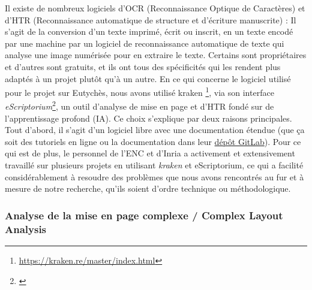 \documentclass[a4paper, twoside, 12pt]{book}
\begin{document}
Il existe de nombreux logiciels d'OCR (Reconnaissance Optique de Caractères) et d'HTR (Reconnaissance automatique de structure et d’écriture manuscrite) : Il s’agit de la conversion d’un texte imprimé, écrit ou inscrit, en un texte encodé par une machine par un logiciel de reconnaissance automatique de texte qui analyse une image numérisée pour en extraire le texte. Certains sont propriétaires et d'autres sont gratuits, et ils ont tous des spécificités qui les rendent plus adaptés à un projet plutôt qu'à un autre. En ce qui concerne le logiciel utilisé pour le projet sur Eutychès, nous avons utilisé kraken \footnote{ \url{https://kraken.re/master/index.html}}, via son interface \textit{eScriptorium}\footnote{\cite{kiessling2019escriptorium}}, un outil d’analyse de mise en page et d’HTR fondé sur de l’apprentissage profond (IA). Ce choix s'explique par deux raisons principales. Tout d'abord, il s'agit d'un logiciel libre avec une documentation étendue (que ça soit des tutoriels en ligne ou la documentation dans leur \href{https://gitlab.inria.fr/scripta/escriptorium}{dépôt GitLab}). Pour ce qui est de plus, le personnel de l'ENC et d'Inria a activement et extensivement travaillé sur plusieurs projets en utilisant \textit{kraken} et eScriptorium\textit{}, ce qui a facilité considérablement à resoudre des problèmes que nous avons rencontrés au fur et à mesure de notre recherche, qu'ils soient d'ordre technique ou méthodologique. 

\subsubsection{ Analyse de la mise en page complexe / Complex Layout Analysis}
\end{document}
